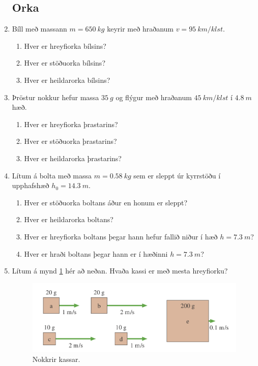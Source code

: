 \ifdefined \wholebook \else\documentclass[oneside]{book}\usepackage{EdlBook}\graphicspath{{figures/}}
\begin{document}
\begin{enumerate}[label = \textbf{Dæmi \thechapter.\arabic*.}]

\subsection*{Orka}

\item Bíll með massann $m = \SI{650}{kg}$ keyrir með hraðanum $v = \SI{95}{km/klst}$.
\begin{enumerate}[label = \textbf{(\alph*)}]
    \item Hver er hreyfiorka bílsins?
    \item Hver er stöðuorka bílsins?
    \item Hver er heildarorka bílsins?
\end{enumerate}

\item Þröstur nokkur hefur massa $\SI{35}{g}$ og flýgur með hraðanum $\SI{45}{km/klst}$ í $\SI{4.8}{m}$ hæð.
\begin{enumerate}[label = \textbf{(\alph*)}]
    \item Hver er hreyfiorka þrastarins?
    \item Hver er stöðuorka þrastarins? 
    \item Hver er heildarorka þrastarins?
\end{enumerate}

\item Lítum á bolta með massa $m = \SI{0.58}{kg}$ sem er sleppt úr kyrrstöðu í upphafshæð $h_0 = \SI{14.3}{m}$.
\begin{enumerate}[label = \textbf{(\alph*)}]
    \item Hver er stöðuorka boltans áður en honum er sleppt?
    \item Hver er heildarorka boltans?
    \item Hver er hreyfiorka boltans þegar hann hefur fallið niður í hæð $h = \SI{7.3}{m}$?
    \item Hver er hraði boltans þegar hann er í hæðinni $h = \SI{7.3}{m}$?
\end{enumerate}

\item Lítum á mynd \ref{fig:sbrkassar} hér að neðan. Hvaða kassi er með mesta hreyfiorku?

\begin{figure}[H]
    \centering
    \includegraphics[scale = 0.3]{images/sbr.png}
    \caption{Nokkrir kassar.}
    \label{fig:sbrkassar}
\end{figure}


\end{enumerate}
\end{document}

